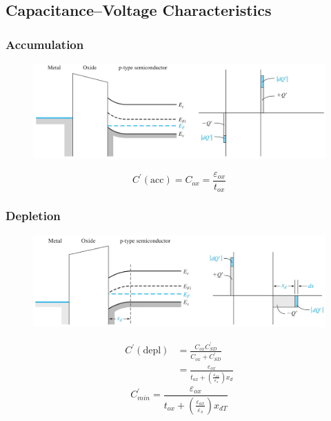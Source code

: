 \documentclass{beamer}
\begin{document}
\subsection{Capacitance–Voltage Characteristics}
    \begin{frame} \frametitle{Accumulation}
        \begin{figure}[H]
            \centering
            \includegraphics[width=0.9\linewidth]{C-V-accumulation.jpg}
            \label{fig:C-V-accumulation.jpg}
        \end{figure}
        \begin{equation*}
            C^\prime (\text{acc}) = C_{ox} = \frac{\varepsilon_{ox} }{t_{ox} }  
        \end{equation*}
    \end{frame}
    \begin{frame} \frametitle{Depletion}
        \begin{figure}[H]
            \centering
            \includegraphics[width=0.9\linewidth]{C-V-depletion.jpg}
            \label{fig:C-V-depletion.jpg}
        \end{figure}
        \begin{equation*}
            \begin{aligned}
                C^\prime (\text{depl}) &= \frac{C_{ox} C^\prime_{SD} }{C_{ox} + C^\prime_{SD} } \\
                &= \frac{\varepsilon_{ox} }{t_{ox} + \left( \frac{\varepsilon_{ox} }{\varepsilon_s}  \right)x_d } 
            \end{aligned}
        \end{equation*}
        \begin{equation*}
            C^\prime_{min} = \frac{\varepsilon_{ox} }{t_{ox} + \left( \frac{\varepsilon_{ox} }{\varepsilon_s}  \right) x_{dT} } 
        \end{equation*}
    \end{frame}
\end{document}
